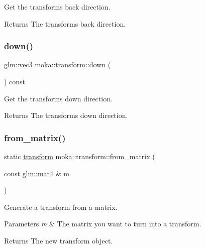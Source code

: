 Get the transform\textquotesingle{}s back direction. 

\begin{DoxyReturn}{Returns}
The transform\textquotesingle{}s back direction. 
\end{DoxyReturn}
\mbox{\label{classmoka_1_1transform_aa639b098139d6b5283ae39c992d70ccf}} 
\subsubsection{\texorpdfstring{down()}{down()}}
{\footnotesize\ttfamily \mbox{\hyperlink{namespacemoka_aed2224bc0e5b79e57a8975ded94ee1aaa97ade28e93c0de60adc075bdbe07ca36}{glm\+::vec3}} moka\+::transform\+::down (\begin{DoxyParamCaption}{ }\end{DoxyParamCaption}) const}



Get the transform\textquotesingle{}s down direction. 

\begin{DoxyReturn}{Returns}
The transform\textquotesingle{}s down direction. 
\end{DoxyReturn}
\mbox{\label{classmoka_1_1transform_a5bbbfa2b9efaeda3d2c11c6f16decf7e}} 
\subsubsection{\texorpdfstring{from\_matrix()}{from\_matrix()}}
{\footnotesize\ttfamily static \mbox{\hyperlink{classmoka_1_1transform}{transform}} moka\+::transform\+::from\+\_\+matrix (\begin{DoxyParamCaption}\item[{const \mbox{\hyperlink{namespacemoka_aed2224bc0e5b79e57a8975ded94ee1aaabe14b41eb96410ea28b32bc138d885ae}{glm\+::mat4}} \&}]{m }\end{DoxyParamCaption})\hspace{0.3cm}{\ttfamily [static]}}



Generate a transform from a matrix. 


\begin{DoxyParams}{Parameters}
{\em m} & The matrix you want to turn into a transform. \\
\hline
\end{DoxyParams}
\begin{DoxyReturn}{Returns}
The new transform object. 
\end{DoxyReturn}
\mbox{\label{classmoka_1_1transform_ac7a59896b1574f7ce6ce9b7e9534fbd9}} 
